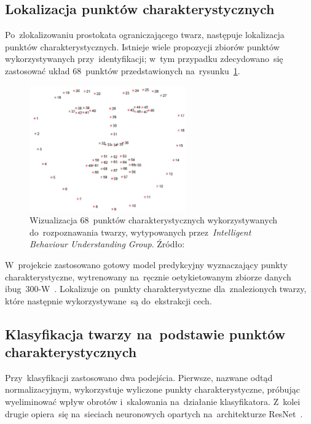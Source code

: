 \documentclass[11pt,a4paper]{article}
\begin{document}
\subsection{Lokalizacja punktów charakterystycznych}

Po~zlokalizowaniu prostokata ograniczającego twarz, następuje lokalizacja punktów charakterystycznych.
Istnieje wiele propozycji zbiorów punktów wykorzystywanych przy~identyfikacji; w~tym przypadku zdecydowano~się zastosować układ 68~punktów przedstawionych na~rysunku~\ref{fig:68-landmarks}.

\begin{figure}[H]
    \centering
    \includegraphics[width=0.6\textwidth]{res/img/figure_68_markup.jpg}
    \caption{Wizualizacja 68~punktów charakterystycznych wykorzystywanych do~rozpoznawania twarzy, wytypowanych przez~\emph{Intelligent Behaviour Understanding Group}. Źródło: \cite{sagonas2013}}
    \label{fig:68-landmarks}
\end{figure}

W~projekcie zastosowano gotowy model predykcyjny wyznaczający punkty charakterystyczne, wytrenowany na~ręcznie oetykietowanym zbiorze danych ibug~300-W~\cite{king2015}.
Lokalizuje on~punkty charakterystyczne dla~znalezionych twarzy, które następnie wykorzystywane~są do~ekstrakcji cech.

\subsection{Klasyfikacja twarzy na~podstawie punktów charakterystycznych}
\label{subsec:classification}

Przy~klasyfikacji zastosowano dwa podejścia.
Pierwsze, nazwane odtąd normalizacyjnym, wykorzystuje wyliczone punkty charakterystyczne, próbując wyeliminować wpływ obrotów i~skalowania na~działanie klasyfikatora.
Z~kolei drugie opiera~się na~sieciach neuronowych opartych na~architekturze ResNet~\cite{he2015}.
\end{document}
